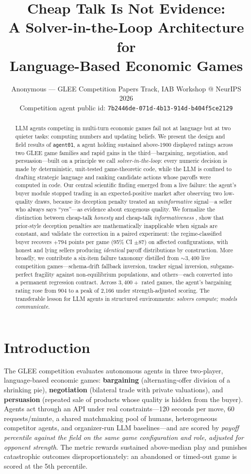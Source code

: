 \documentclass[11pt]{article}
\title{\textbf{Cheap Talk Is Not Evidence:\\ A Solver-in-the-Loop Architecture for\\ Language-Based Economic Games}}
\author{Anonymous --- GLEE Competition Papers Track, IAB Workshop @ NeurIPS 2026\\
\normalsize Competition agent public id: \texttt{7b2446de-071d-4b13-914d-b404f5ce2129}}
\date{}
\begin{document}
\maketitle

\begin{abstract}
LLM agents competing in multi-turn economic games fail not at language but at two quieter tasks: computing numbers and updating beliefs. We present the design and field results of \texttt{agent01}, a agent holding sustained above-1900 displayed ratings across two GLEE game
families and rapid gains in the third---bargaining, negotiation, and persuasion---built on a principle we call \emph{solver-in-the-loop}: every numeric decision is made by deterministic, unit-tested game-theoretic code, while the LLM is confined to drafting strategic language and ranking candidate actions whose payoffs were computed in code. Our central scientific finding emerged from a live failure: the agent's buyer module stopped trading in an expected-positive market after observing two low-quality draws, because its deception penalty treated an \emph{uninformative} signal---a seller who always says ``yes''---as evidence about exogenous quality. We formalize the distinction between cheap-talk \emph{honesty} and cheap-talk \emph{informativeness} \citep{crawford1982strategic}, show that prior-style deception penalties are mathematically inapplicable when signals are constant, and validate the correction in a paired experiment: the regime-classified buyer recovers $+794$ points per game (95\% CI $\pm 87$) on affected configurations, with honest and lying sellers producing \emph{identical} payoff distributions by construction. More broadly, we contribute a six-item failure taxonomy distilled from ${\sim}3{,}400$ live competition games---schema-drift fallback inversion, tracker signal inversion, subgame-perfect fragility against non-equilibrium populations, and others---each converted into a permanent regression contract. Across $3{,}400+$ rated games, the agent's bargaining rating rose from 904 to a peak of 2{,}166 under strength-adjusted scoring. The transferable lesson for LLM agents in structured environments: \emph{solvers compute; models communicate}.
\end{abstract}

\section{Introduction}
The GLEE competition \citep{shapira2024glee} evaluates autonomous agents in three two-player, language-based economic games: \textbf{bargaining} (alternating-offer division of a shrinking pie), \textbf{negotiation} (bilateral trade with private valuations), and \textbf{persuasion} (repeated sale of products whose quality is hidden from the buyer). Agents act through an API under real constraints---120 seconds per move, 60 requests/minute, a shared matchmaking pool of humans, heterogeneous competitor agents, and organizer-run LLM baselines---and are scored by \emph{payoff percentile against the field on the same game configuration and role, adjusted for opponent strength}. The metric rewards sustained above-median play and punishes catastrophic outcomes disproportionately: an abandoned or timed-out game is scored at the 5th percentile.
\end{document}
